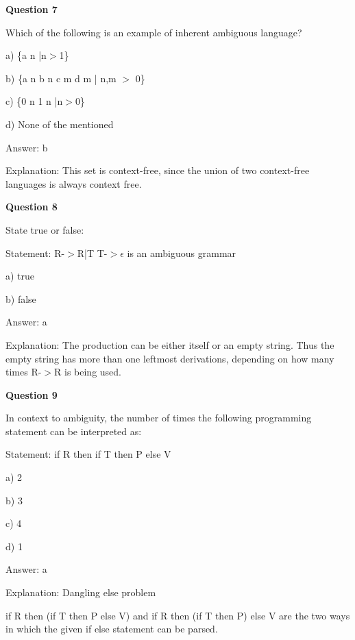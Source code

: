 \documentclass{article}
\begin{document}
\begin{mdframed}[linewidth=1pt, roundcorner=5pt, linecolor=gray!30, backgroundcolor=gray!5]
\textbf{Question 7} 

Which of the following is an example of inherent ambiguous language?

a) \{a
n
|n$>$1\}

b) \{a
n
b
n
c
m
d
m
| n,m $>$ 0\}

c) \{0
n
1
n
|n$>$0\}

d) None of the mentioned
\vspace{5pt} \par
\begin{tcolorbox}[colback=green!5, colframe=green!40!black, title=Solution]
Answer: b

Explanation: This set is context-free, since the union of two context-free languages is always context free.
\end{tcolorbox}
\end{mdframed}

\begin{mdframed}[linewidth=1pt, roundcorner=5pt, linecolor=gray!30, backgroundcolor=gray!5]
\textbf{Question 8} 

State true or false:

Statement: R-$>$R|T   T-$>$$\epsilon$ is an ambiguous grammar

a) true

b) false
\vspace{5pt} \par
\begin{tcolorbox}[colback=green!5, colframe=green!40!black, title=Solution]
Answer: a

Explanation: The production can be either itself or an empty string. Thus the empty string has more than one leftmost derivations, depending on how many times R-$>$R is being used.
\end{tcolorbox}
\end{mdframed}

\begin{mdframed}[linewidth=1pt, roundcorner=5pt, linecolor=gray!30, backgroundcolor=gray!5]
\textbf{Question 9} 

In context to ambiguity, the number of times the following programming statement can be interpreted as:

Statement: if R then if T then P else V

a) 2

b) 3

c) 4

d) 1
\vspace{5pt} \par
\begin{tcolorbox}[colback=green!5, colframe=green!40!black, title=Solution]
Answer: a

Explanation:  Dangling else problem

if R then (if T then P else V) and if R then (if T then P) else V are the two ways in which the given if else statement can be parsed.
\end{tcolorbox}
\end{mdframed}
\newpage
\end{document}
